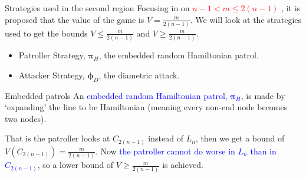 \documentclass[11pt]{beamer}
\begin{document}
\begin{frame}{Strategies used in the second region}
Focusing in on \textcolor{red}{$n-1 < m \leq 2(n-1)$} , it is proposed that the value of the game is $V=\frac{m}{2(n-1)}$. We will look at the strategies used to get the bounds $V \leq \frac{m}{2(n-1)}$ and $V \geq \frac{m}{2(n-1)}$.

\begin{itemize}
\item Patroller Strategy, $\bm{\pi}_{H}$, the embedded random Hamiltonian patrol.
\item Attacker Strategy, $\bm{\phi}_{D}$, the diametric attack.
\end{itemize}

\end{frame}

\begin{frame}{Embedded patrols}
An \textcolor{blue}{embedded random Hamiltonian patrol, $\bm{\pi}_{H}$}, is made by `expanding' the line to be Hamiltonian (meaning every non-end node becomes two nodes).

That is the patroller looks at $C_{2(n-1)}$ instead of $L_{n}$, then we get a bound of $V(C_{2(n-1)})=\frac{m}{2(n-1)}$. Now \textcolor{blue}{the patroller cannot do worse in $L_{n}$ than in $C_{2(n-1)}$}, so a lower bound of $V \geq \frac{m}{2(n-1)} $ is achieved.

\begin{figure}
\begin{center}
\end{center}
\end{figure}
\end{frame}
\end{document}
